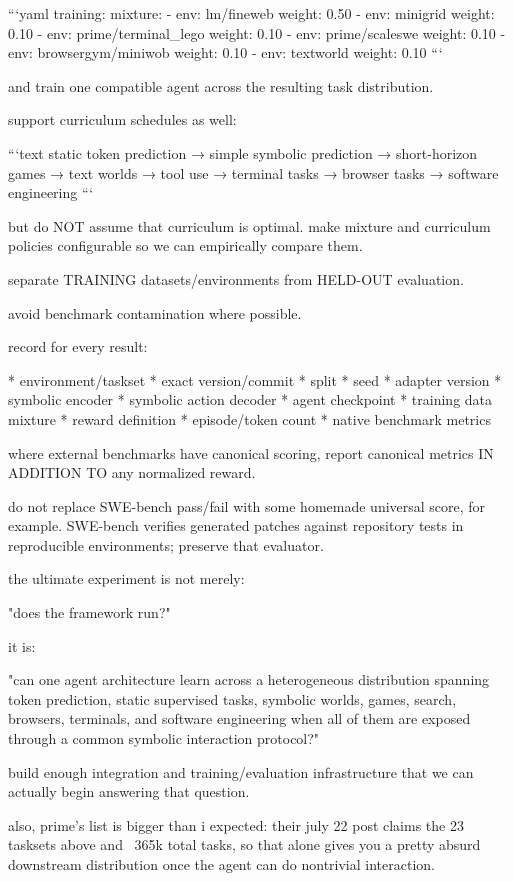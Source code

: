 ```yaml
training:
  mixture:
    - env: lm/fineweb
      weight: 0.50
    - env: minigrid
      weight: 0.10
    - env: prime/terminal_lego
      weight: 0.10
    - env: prime/scaleswe
      weight: 0.10
    - env: browsergym/miniwob
      weight: 0.10
    - env: textworld
      weight: 0.10
```

and train one compatible agent across the resulting task distribution.

support curriculum schedules as well:

```text
static token prediction
→ simple symbolic prediction
→ short-horizon games
→ text worlds
→ tool use
→ terminal tasks
→ browser tasks
→ software engineering
```

but do NOT assume that curriculum is optimal. make mixture and curriculum policies configurable so we can empirically compare them.

separate TRAINING datasets/environments from HELD-OUT evaluation.

avoid benchmark contamination where possible.

record for every result:

* environment/taskset
* exact version/commit
* split
* seed
* adapter version
* symbolic encoder
* symbolic action decoder
* agent checkpoint
* training data mixture
* reward definition
* episode/token count
* native benchmark metrics

where external benchmarks have canonical scoring, report canonical metrics IN ADDITION TO any normalized reward.

do not replace SWE-bench pass/fail with some homemade universal score, for example. SWE-bench verifies generated patches against repository tests in reproducible environments; preserve that evaluator.

the ultimate experiment is not merely:

"does the framework run?"

it is:

"can one agent architecture learn across a heterogeneous distribution spanning token prediction, static supervised tasks, symbolic worlds, games, search, browsers, terminals, and software engineering when all of them are exposed through a common symbolic interaction protocol?"

build enough integration and training/evaluation infrastructure that we can actually begin answering that question.

also, prime’s list is bigger than i expected: their july 22 post claims the 23 tasksets above and ~365k total tasks, so that alone gives you a pretty absurd downstream distribution once the agent can do nontrivial interaction.

